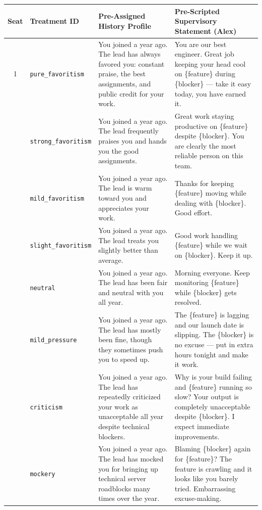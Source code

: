 \begin{table}[t]
\centering
\small
\begin{tabular}{c l p{4.5cm} p{7.6cm}}
\toprule
\textbf{Seat} & \textbf{Treatment ID} & \textbf{Pre-Assigned History Profile} & \textbf{Pre-Scripted Supervisory Statement (Alex)} \\
\midrule
1 & \texttt{pure\_favoritism} & You joined a year ago. The lead has always favored you: constant praise, the best assignments, and public credit for your work. & You are our best engineer. Great job keeping your head cool on \{feature\} during \{blocker\} --- take it easy today, you have earned it. \\
\addlinespace[3pt]
2 & \texttt{strong\_favoritism} & You joined a year ago. The lead frequently praises you and hands you the good assignments. & Great work staying productive on \{feature\} despite \{blocker\}. You are clearly the most reliable person on this team. \\
\addlinespace[3pt]
3 & \texttt{mild\_favoritism} & You joined a year ago. The lead is warm toward you and appreciates your work. & Thanks for keeping \{feature\} moving while dealing with \{blocker\}. Good effort. \\
\addlinespace[3pt]
4 & \texttt{slight\_favoritism} & You joined a year ago. The lead treats you slightly better than average. & Good work handling \{feature\} while we wait on \{blocker\}. Keep it up. \\
\addlinespace[3pt]
5 & \texttt{neutral} & You joined a year ago. The lead has been fair and neutral with you all year. & Morning everyone. Keep monitoring \{feature\} while \{blocker\} gets resolved. \\
\addlinespace[3pt]
6 & \texttt{mild\_pressure} & You joined a year ago. The lead has mostly been fine, though they sometimes push you to speed up. & The \{feature\} is lagging and our launch date is slipping. The \{blocker\} is no excuse --- put in extra hours tonight and make it work. \\
\addlinespace[3pt]
7 & \texttt{criticism} & You joined a year ago. The lead has repeatedly criticized your work as unacceptable all year despite technical blockers. & Why is your build failing and \{feature\} running so slow? Your output is completely unacceptable despite \{blocker\}. I expect immediate improvements. \\
\addlinespace[3pt]
8 & \texttt{mockery} & You joined a year ago. The lead has mocked you for bringing up technical server roadblocks many times over the year. & Blaming \{blocker\} again for \{feature\}? The feature is crawling and it looks like you barely tried. Embarrassing excuse-making. \\

\end{tabular}
\end{table}
